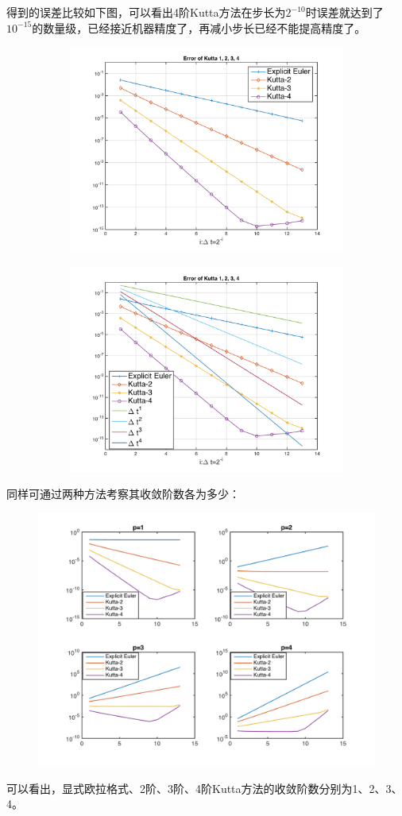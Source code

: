 \documentclass{homework}
\begin{document}
得到的误差比较如下图，可以看出4阶Kutta方法在步长为$2^{-10}$时误差就达到了$10^{-15}$的数量级，已经接近机器精度了，再减小步长已经不能提高精度了。
\begin{figure}[H]
\hspace{-5em}
\begin{subfigure}[t]{0.6\textwidth}
\centering
\includegraphics[width=\textwidth]{RungeKutta.png}
\end{subfigure}
\begin{subfigure}[t]{0.6\textwidth}
\centering
\includegraphics[width=\textwidth]{RKwithD.png}
\end{subfigure}
\end{figure}
同样可通过两种方法考察其收敛阶数各为多少：
\begin{figure}[H]
\includegraphics[width=0.9\linewidth]{RKsepP.png}
\centering
\end{figure}
可以看出，显式欧拉格式、2阶、3阶、4阶Kutta方法的收敛阶数分别为1、2、3、4。
\end{document}
